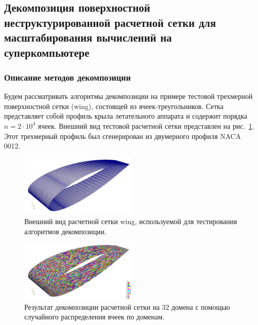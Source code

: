 \subsection{Декомпозиция поверхностной неструктурированной расчетной сетки для масштабирования вычислений на суперкомпьютере}

\subsubsection{Описание методов декомпозиции}

Будем рассматривать алгоритмы декомпозиции на примере тестовой трехмерной поверхностной сетки (wing), состоящей из ячеек-треугольников.
Сетка представляет собой профиль крыла летательного аппарата и содержит порядка $n = 2 \cdot 10^4$ ячеек.
Внешний вид тестовой расчетной сетки представлен на рис.~\ref{fig:text_2_decompsurf_wing_grid}.
Этот трехмерный профиль был сгенерирован из двумерного профиля NACA 0012.

\begin{figure}[ht]
	\centering
	\includegraphics[width=0.5\textwidth]{./pics/text_2_decompsurf/wing_grid.png}
	\caption{Внешний вид расчетной сетки wing, используемой для тестирования алгоритмов декомпозиции.}
	\label{fig:text_2_decompsurf_wing_grid}
\end{figure}

\begin{figure}[ht]
	\centering
	\includegraphics[width=0.5\textwidth]{./pics/text_2_decompsurf/wing_random_32.png}
	\caption{Результат декомпозиции расчетной сетки на 32 домена с помощью случайного распределения ячеек по доменам.}
	\label{fig:text_2_decompsurf_wing_random_32}
\end{figure}

